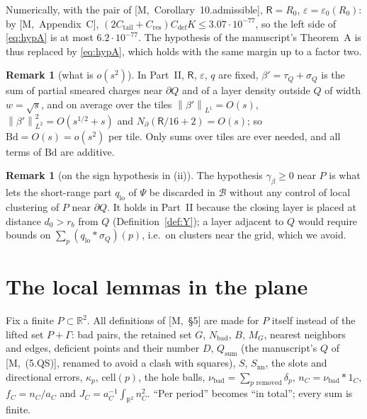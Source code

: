 \documentclass[11pt,reqno]{amsart}
\numberwithin{equation}{section}
\theoremstyle{plain}
\theoremstyle{definition}
\newtheorem{remark}[theorem]{Remark}
\newcommand{\R}{\mathbb{R}}
\newcommand{\lo}{\mathrm{lo}}
\newcommand{\nn}{\mathrm{nn}}
\newcommand{\bad}{\mathrm{bad}}
\newcommand{\norm}[1]{\left\|#1\right\|}
\newcommand{\Cc}[1]{C_{\mathrm{#1}}}
\newcommand{\cB}{\mathcal{B}}
\newcommand{\fR}{\mathsf{R}}
\newcommand{\Bd}{\mathrm{Bd}}
\newcommand{\ms}[1]{\textup{[M,~#1]}}
\begin{document}
Numerically, with the pair of \ms{Corollary~10.admissible}, $\fR=R_0$, $\varepsilon=\varepsilon_0(R_0)$: by \ms{Appendix~C}, $(2\Cc{tail}+\Cc{res})\Cc{def}K\le3.07\cdot10^{-77}$, so the left side of \eqref{eq:hypA} is at most $6.2\cdot10^{-77}$.  The hypothesis of the manuscript's Theorem~A is thus replaced by \eqref{eq:hypA}, which holds with the same margin up to a factor two.

\begin{remark}[what is $o(s^2)$]\label{rem:regime}
In Part~II, $\fR$, $\varepsilon$, $q$ are fixed, $\beta'=\tau_Q+\sigma_Q$ is the sum of partial smeared charges near $\partial Q$ and of a layer density outside $Q$ of width $w=\sqrt s$, and on average over the tiles $\norm{\beta'}_{L^1}=O(s)$, $\norm{\beta'}_{L^2}^2=O(s^{1/2}+s)$ and $N_\partial(\fR/16+2)=O(s)$; so $\Bd=O(s)=o(s^2)$ per tile.  Only sums over tiles are ever needed, and all terms of $\Bd$ are additive.
\end{remark}

\begin{remark}[on the sign hypothesis in (ii)]
The hypothesis $\gamma_\beta\ge0$ near $P$ is what lets the short-range part $q_\lo$ of $\Psi$ be discarded in $\cB$ without any control of local clustering of $P$ near $\partial Q$.  It holds in Part~II because the closing layer is placed at distance $d_0>r_b$ from $Q$ (Definition~\ref{def:Y}); a layer adjacent to $Q$ would require bounds on $\sum_p(q_\lo*\sigma_Q)(p)$, i.e.\ on clusters near the grid, which we avoid.
\end{remark}

\section{The local lemmas in the plane}\label{sec:local}

Fix a finite $P\subset\R^2$.  All definitions of \ms{\S5} are made for $P$ itself instead of the lifted set $P+\Gamma$: bad pairs, the retained set $G$, $N_\bad$, $B$, $M_G$, nearest neighbors and edges, deficient points and their number $D$, $Q_{\mathrm{sum}}$ (the manuscript's $Q$ of \ms{(5.QS)}, renamed to avoid a clash with squares), $S$, $S_\nn$, the slots and directional errors, $\kappa_p$, $\mathrm{cell}(p)$, the hole balls, $\nu_\bad=\sum_{p\text{ removed}}\delta_p$, $n_C=\nu_\bad*1_C$, $f_C=n_C/a_C$ and $J_C=a_C^{-1}\int_{\R^2}n_C^2$.  ``Per period'' becomes ``in total''; every sum is finite.
\end{document}
